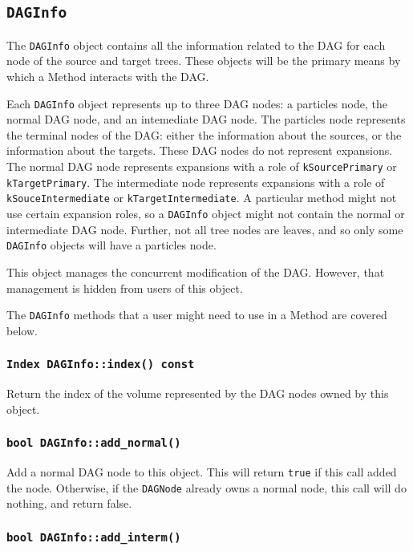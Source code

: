 \subsection{\texttt{DAGInfo}}

The \texttt{DAGInfo} object contains all the information related to the DAG
for each node of the source and target trees. These objects will be the
primary means by which a Method interacts with the DAG.

Each \texttt{DAGInfo} object represents up to three DAG nodes: a particles
node, the normal DAG node, and an intemediate DAG node. The particles node
represents the terminal nodes of the DAG: either the information about
the sources, or the information about the targets. These DAG nodes do not
represent expansions. The normal
DAG node represents expansions with a role of \texttt{kSourcePrimary} or
\texttt{kTargetPrimary}. The intermediate node represents expansions with a
role of \texttt{kSouceIntermediate} or \texttt{kTargetIntermediate}. A
particular method might not use certain expansion roles, so a
\texttt{DAGInfo} object might not contain the normal or intermediate DAG node.
Further, not all tree nodes are leaves, and so only some \texttt{DAGInfo}
objects will have a particles node.

This object manages the concurrent modification of the DAG. However, that
management is hidden from users of this object.

The \texttt{DAGInfo} methods that a user might need to use in a Method are
covered below.

\subsubsection{\texttt{Index DAGInfo::index() const}}

Return the index of the volume represented by the DAG nodes owned by this
object.

\subsubsection{\texttt{bool DAGInfo::add\_normal()}}

Add a normal DAG node to this object. This will return \texttt{true} if this
call added the node. Otherwise, if the \texttt{DAGNode} already owns a normal
node, this call will do nothing, and return false.

\subsubsection{\texttt{bool DAGInfo::add\_interm()}}

